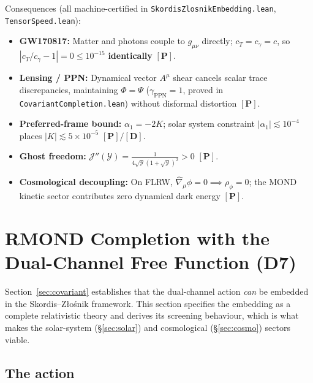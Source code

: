 \documentclass[aps,prd,preprint,superscriptaddress,nofootinbib,amsmath,amssymb,floatfix]{revtex4-2}
\begin{document}
Consequences (all machine-certified in \texttt{SkordisZlosnikEmbedding.lean}, \texttt{TensorSpeed.lean}):
\begin{itemize}
    \item \textbf{GW170817:} Matter and photons couple to $g_{\mu\nu}$ directly; $c_T = c_\gamma = c$, so $|c_T/c_\gamma - 1| = 0 \le 10^{-15}$ \textbf{identically} $\mathbf{[P]}$.
    \item \textbf{Lensing / PPN:} Dynamical vector $A^\mu$ shear cancels scalar trace discrepancies, maintaining $\Phi = \Psi$ ($\gamma_{\text{PPN}} = 1$, proved in \texttt{CovariantCompletion.lean}) without disformal distortion $\mathbf{[P]}$.
    \item \textbf{Preferred-frame bound:} $\alpha_1 = -2K$; solar system constraint $|\alpha_1| \lesssim 10^{-4}$ places $|K| \lesssim 5\times 10^{-5}$ $\mathbf{[P]/[D]}$.
    \item \textbf{Ghost freedom:} $\mathcal{J}''(\mathcal{Y}) = \tfrac{1}{4\sqrt{\mathcal{Y}}(1+\sqrt{\mathcal{Y}})^2} > 0$ $\mathbf{[P]}$.
    \item \textbf{Cosmological decoupling:} On FLRW, $\hat\nabla_\mu\phi = 0 \implies \rho_\phi = 0$; the MOND kinetic sector contributes zero dynamical dark energy $\mathbf{[P]}$.
\end{itemize}

\section{RMOND Completion with the Dual-Channel Free Function (D7)}
\label{sec:rmond}

Section~\ref{sec:covariant} establishes that the dual-channel action \emph{can} be embedded in the Skordis--Z\l{}o\'snik framework. This section specifies the embedding as a complete relativistic theory and derives its screening behaviour, which is what makes the solar-system (\S\ref{sec:solar}) and cosmological (\S\ref{sec:cosmo}) sectors viable.

\subsection{The action}
\end{document}
